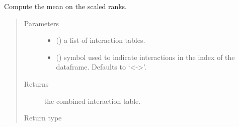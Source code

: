 \documentclass[letterpaper,10pt,english]{sphinxmanual}
\begin{document}
\begin{fulllineitems}
\label{\detokenize{_modules/cosifer.combiners:cosifer.combiners.cit.mean_scaled_ranks_table}}
Compute the mean on the scaled ranks.
\begin{quote}\begin{description}
\item[{Parameters}] \leavevmode\begin{itemize}
\item {} 
 () \textendash{} a list of interaction tables.

\item {} 
 (\sphinxstyleliteralemphasis{\sphinxupquote{, }}) \textendash{} symbol used to indicate
interactions in the index of the dataframe. Defaults to ‘\textless{}-\textgreater{}’.

\end{itemize}

\item[{Returns}] \leavevmode
the combined interaction table.

\item[{Return type}] \leavevmode
{\hyperref[\detokenize{_modules/cosifer.collections:cosifer.collections.interaction_table.InteractionTable}]{}}

\end{description}\end{quote}

\end{fulllineitems}

\end{document}
